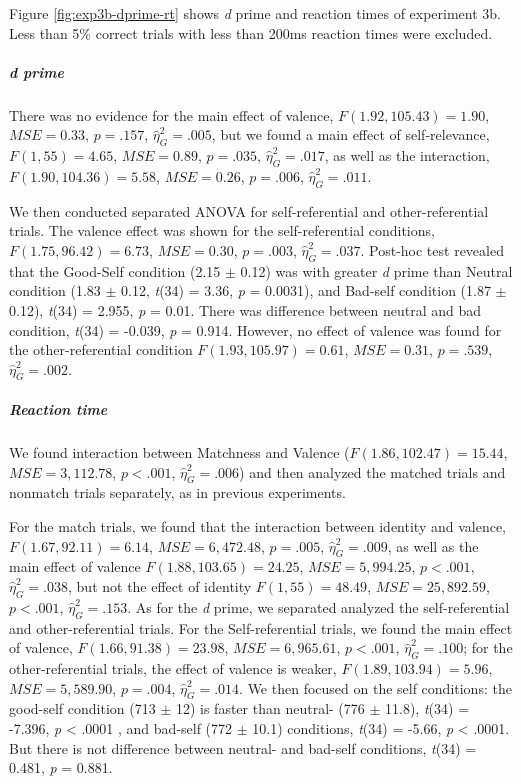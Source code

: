 \documentclass[
  english,
  man]{apa6}
\let\oldsubparagraph\subparagraph
\renewcommand{\subparagraph}[1]{\oldsubparagraph{#1}\mbox{}}
\begin{document}
Figure \ref{fig:exp3b-dprime-rt} shows \emph{d} prime and reaction times of experiment 3b. Less than 5\% correct trials with less than 200ms reaction times were excluded.

\hypertarget{d-prime-4}{%
\subparagraph{d prime}\label{d-prime-4}}

There was no evidence for the main effect of valence, \(F(1.92, 105.43) = 1.90\), \(\mathit{MSE} = 0.33\), \(p = .157\), \(\hat{\eta}^2_G = .005\), but we found a main effect of self-relevance, \(F(1, 55) = 4.65\), \(\mathit{MSE} = 0.89\), \(p = .035\), \(\hat{\eta}^2_G = .017\), as well as the interaction, \(F(1.90, 104.36) = 5.58\), \(\mathit{MSE} = 0.26\), \(p = .006\), \(\hat{\eta}^2_G = .011\).

We then conducted separated ANOVA for self-referential and other-referential trials. The valence effect was shown for the self-referential conditions, \(F(1.75, 96.42) = 6.73\), \(\mathit{MSE} = 0.30\), \(p = .003\), \(\hat{\eta}^2_G = .037\). Post-hoc test revealed that the Good-Self condition (2.15 \(\pm\) 0.12) was with greater \emph{d} prime than Neutral condition (1.83 \(\pm\) 0.12, \emph{t}(34) = 3.36, \emph{p} = 0.0031), and Bad-self condition (1.87 \(\pm\) 0.12), \emph{t}(34) = 2.955, \emph{p} = 0.01. There was difference between neutral and bad condition, \emph{t}(34) = -0.039, \emph{p} = 0.914. However, no effect of valence was found for the other-referential condition \(F(1.93, 105.97) = 0.61\), \(\mathit{MSE} = 0.31\), \(p = .539\), \(\hat{\eta}^2_G = .002\).

\hypertarget{reaction-time-6}{%
\subparagraph{Reaction time}\label{reaction-time-6}}

We found interaction between Matchness and Valence (\(F(1.86, 102.47) = 15.44\), \(\mathit{MSE} = 3,112.78\), \(p < .001\), \(\hat{\eta}^2_G = .006\)) and then analyzed the matched trials and nonmatch trials separately, as in previous experiments.

For the match trials, we found that the interaction between identity and valence, \(F(1.67, 92.11) = 6.14\), \(\mathit{MSE} = 6,472.48\), \(p = .005\), \(\hat{\eta}^2_G = .009\), as well as the main effect of valence \(F(1.88, 103.65) = 24.25\), \(\mathit{MSE} = 5,994.25\), \(p < .001\), \(\hat{\eta}^2_G = .038\), but not the effect of identity \(F(1, 55) = 48.49\), \(\mathit{MSE} = 25,892.59\), \(p < .001\), \(\hat{\eta}^2_G = .153\). As for the \emph{d} prime, we separated analyzed the self-referential and other-referential trials. For the Self-referential trials, we found the main effect of valence, \(F(1.66, 91.38) = 23.98\), \(\mathit{MSE} = 6,965.61\), \(p < .001\), \(\hat{\eta}^2_G = .100\); for the other-referential trials, the effect of valence is weaker, \(F(1.89, 103.94) = 5.96\), \(\mathit{MSE} = 5,589.90\), \(p = .004\), \(\hat{\eta}^2_G = .014\). We then focused on the self conditions: the good-self condition (713 \(\pm\) 12) is faster than neutral- (776 \(\pm\) 11.8), \emph{t}(34) = -7.396, \emph{p} \textless{} .0001 , and bad-self (772 \(\pm\) 10.1) conditions, \emph{t}(34) = -5.66, \emph{p} \textless{} .0001. But there is not difference between neutral- and bad-self conditions, \emph{t}(34) = 0.481, \emph{p} = 0.881.
\end{document}
